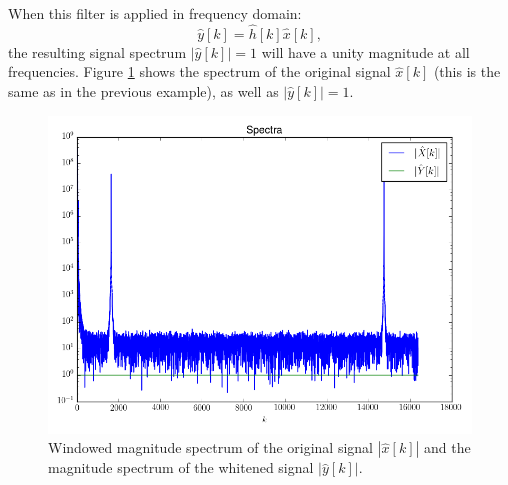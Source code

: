 When this filter is applied in frequency domain:
\begin{equation}
  \hat{y}[k] = \hat{h}[k]\hat{x}[k],
\end{equation}
the resulting signal spectrum $|\hat{y}[k]|=1$ will have a unity
magnitude at all frequencies. Figure \ref{fig:whiten_specs} shows the
spectrum of the original signal $\hat{x}[k]$ (this is the same as in
the previous example), as well as $|\hat{y}[k]|=1$.

\begin{figure}
  \begin{center}
    \includegraphics[width=\textwidth]{ch17/figures/whiten_spec.png}
  \end{center}
  \caption{Windowed magnitude spectrum of the original signal $|\hat{x}[k]|$ and the magnitude spectrum of the whitened signal $|\hat{y}[k]|$.}
  \label{fig:whiten_specs}
\end{figure}

